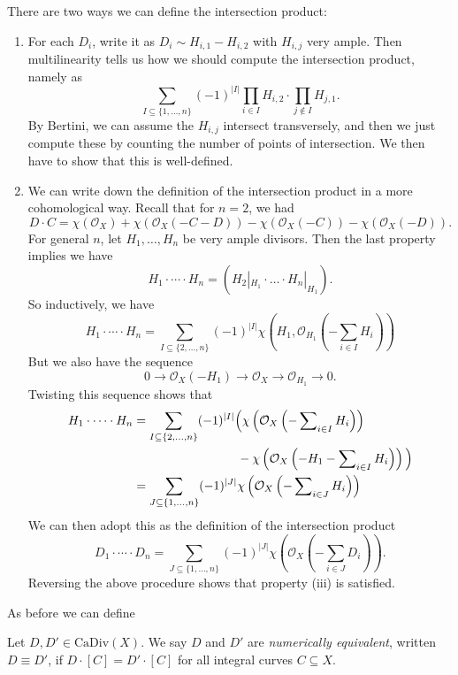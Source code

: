 \documentclass[a4paper]{article}
\newcommand\CaDiv{\mathrm{CaDiv}}
\begin{document}
There are two ways we can define the intersection product:
\begin{enumerate}
  \item For each $D_i$, write it as $D_i \sim H_{i, 1} - H_{i, 2}$ with $H_{i, j}$ very ample. Then multilinearity tells us how we should compute the intersection product, namely as
    \[
      \sum_{I \subseteq \{1, \ldots, n\}} (-1)^{|I|} \prod_{i \in I} H_{i, 2} \cdot \prod_{j \not \in I} H_{j, 1}.
    \]
    By Bertini, we can assume the $H_{i, j}$ intersect transversely, and then we just compute these by counting the number of points of intersection. We then have to show that this is well-defined.
  \item We can write down the definition of the intersection product in a more cohomological way. Recall that for $n = 2$, we had
    \[
      D \cdot C = \chi(\mathcal{O}_X) + \chi(\mathcal{O}_X(-C - D)) - \chi(\mathcal{O}_X (-C)) - \chi(\mathcal{O}_X(-D)).
    \]
    For general $n$, let $H_1, \ldots, H_n$ be very ample divisors. Then the last property implies we have
    \[
      H_1 \cdot \cdots \cdot H_n = (H_2|_{H_1} \cdot \ldots \cdot H_n|_{H_1}).
    \]
    So inductively, we have
    \[
      H_1 \cdot \cdots \cdot H_n = \sum_{I \subseteq \{2, \ldots, n\}} (-1)^{|I|} \chi\left(H_1, \mathcal{O}_{H_1}\left(- \sum_{i \in I} H_i\right)\right)
    \]
    But we also have the sequence
    \[
      0 \to \mathcal{O}_X(-H_1) \to \mathcal{O}_X \to \mathcal{O}_{H_1} \to 0.
    \]
    Twisting this sequence shows that
    \begin{align*}
      H_1 \cdot \cdots \cdot H_n &= \sum_{I \subseteq \{2, \ldots, n\}} (-1)^{|I|}\Big(\chi\left(\mathcal{O}_X\left(- \sum\nolimits_{i \in I} H_i\right)\right)\\
      &\hphantom{aaaaaaaaaaaaaaaa}- \chi\left(\mathcal{O}_X\left(- H_1 - \sum\nolimits_{i \in I} H_i\right)\right)\Big)\\
      &= \sum_{J \subseteq \{1, \ldots, n\}} (-1)^{|J|} \chi\left(\mathcal{O}_X\left(- \sum\nolimits_{i \in J} H_i\right)\right)
    \end{align*}
    We can then adopt this as the definition of the intersection product
    \[
      D_1 \cdot \cdots \cdot D_n = \sum_{J \subseteq \{1, \ldots, n\}} (-1)^{|J|} \chi\left(\mathcal{O}_X\left(- \sum_{i \in J} D_i\right)\right).
    \]
    Reversing the above procedure shows that property (iii) is satisfied.
\end{enumerate}

As before we can define
\begin{defi}
  Let $D, D' \in \CaDiv(X)$. We say $D$ and $D'$ are \emph{numerically equivalent}, written $D \equiv D'$, if $D \cdot [C] = D' \cdot [C]$ for all integral curves $C \subseteq X$.
\end{defi}
\end{document}
